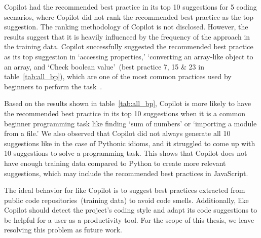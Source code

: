 Copilot had the recommended best practice in its top 10 suggestions for 5 coding scenarios, where Copilot did not rank the recommended best practice as the top suggestion. 
The ranking methodology of Copilot is not disclosed. However, the results suggest that it is heavily influenced by the frequency of the approach in the training data. 
Copilot successfully suggested the recommended best practice as its top suggestion in `accessing properties,' `converting an array-like object to an array, and `Check boolean value'~(best practice 7, 15 \& 23 in table~\ref{tab:all_bp}), which are one of the most common practices used by beginners to perform the task~\cite{airbnb_code}.

Based on the results shown in table~\ref{tab:all_bp}, Copilot is more likely to have the recommended best practice in its top 10 suggestions when it is a common beginner programming task like finding `sum of numbers' or `importing a module from a file.' 
We also observed that Copilot did not always generate all 10 suggestions like in the case of Pythonic idioms, and it struggled to come up with 10 suggestions to solve a programming task.
This shows that Copilot does not have enough training data compared to Python to create more relevant suggestions, which may include the recommended best practices in JavaScript.

The ideal behavior for \cct{} like Copilot is to suggest best practices extracted from public code repositories~(training data) to avoid code smells. 
Additionally, \cct{} like Copilot should detect the project's coding style and adapt its code suggestions to be helpful for a user as a productivity tool. 
For the scope of this thesis, we leave resolving this problem as future work.

